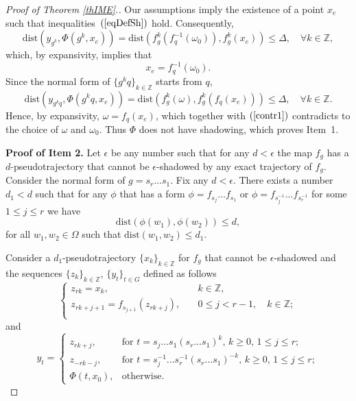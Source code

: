 \begin{proof}[Proof of Theorem \ref{thIME}.]
Our assumptions imply the existence of a point $x_e$ such that inequalities~$(\ref{eqDefSh})$ hold.
Consequently,
$$\mbox{dist}(y_{g^k},\Phi(g^k,x_e))=\mbox{dist}(f_g^k(f_{q}^{-1}(\omega_0)) ,f_g^k(x_e))\leq \Delta,\quad\forall k\in\mathbb{Z},$$
which, by expansivity, implies that
\begin{equation}
\label{contr1}
x_e = f_q^{-1}(\omega_0).
\end{equation}
Since the normal form of $\{g^kq\}_{k\in\mathbb{Z}}$ starts from $q$,
$$\mbox{dist}(y_{g^kq},\Phi(g^kq,x_e))=\mbox{dist}(f_{g}^k(\omega), f_{g}^k(f_q(x_e)))\leq \Delta,\quad\forall k\in\mathbb{Z}.$$
Hence, by expansivity, $\omega = f_q(x_e)$, which together with $(\ref{contr1})$ contradicts to the choice of $\omega$ and $\omega_0$.
Thus $\Phi$ does not have shadowing, which proves Item~1.

\textbf{Proof of Item 2.}
Let $\epsilon$ be any number such that for any $d<\epsilon$ the map $f_g$ has a $d$-pseudotrajectory that cannot be $\epsilon$-shadowed by any exact trajectory of $f_g$.
Consider the normal form of $g=s_r\ldots s_1$.
Fix any $d<\epsilon$. There exists a number $d_1<d$ such that for any $\phi$ that has a form $\phi=f_{s_j}\ldots f_{s_1}$ or $\phi= f_{s_j^{-1}} \ldots f_{s_{r}^{-1}}$ for some $1\leq j\leq r$ we have
\begin{equation}
\label{importref}
\mbox{dist}(\phi(w_1),\phi(w_2))\leq d,
\end{equation}
for all $w_1,w_2\in\Omega$ such that $\mbox{dist}(w_1,w_2)\leq d_1$.


Consider a $d_1$-pseudotrajectory $\{x_k\}_{k\in\mathbb{Z}}$ for $f_g$ that cannot be $\epsilon$-shadowed and
the sequences $\{z_k\}_{k\in\mathbb{Z}}$, $\{y_t\}_{t \in G}$ defined as follows
$$
\begin{cases}
z_{rk} = x_k, & \quad k\in\mathbb{Z},\\
z_{rk+j+1} = f_{s_{j+1}}(z_{rk+j}), & \quad 0 \leq j < r-1, \quad k \in \mathbb{Z};\\
\end{cases}
$$
and
$$
y_t = \begin{cases}
z_{rk+j}, & \mbox{for $t=s_j\ldots s_1(s_r\ldots s_1)^k$, $k\geq0$, $1\leq j\leq r$};\\
z_{-rk-j}, & \mbox{for $t=s_j^{-1}\ldots s_r^{-1}(s_r\ldots s_1)^{-k}$, $k\geq0$, $1\leq j\leq r$};\\
\Phi(t,x_0), & \mbox{otherwise}.
\end{cases}
$$


\end{proof}
